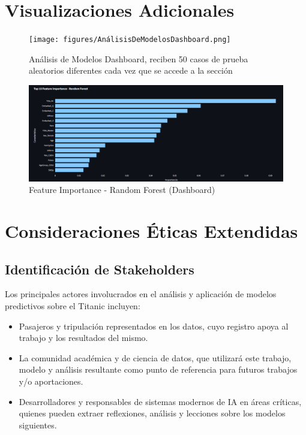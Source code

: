 \documentclass[conference]{IEEEtran}
\begin{document}
\section{Visualizaciones Adicionales}
\begin{figure}[H]
    \centering
    \texttt{[image: figures/AnálisisDeModelosDashboard.png]}
    \caption{Análisis de Modelos Dashboard, reciben 50 casos de prueba aleatorios diferentes cada vez que se accede a la sección}
    \label{fig:placeholder}
\end{figure}

\begin{figure}[H]
    \centering
    \includegraphics[width=\linewidth]{figures/FeatureImportanceRandomForestDashboard.png}
    \caption{Feature Importance - Random Forest (Dashboard)}
    \label{fig:placeholder}
\end{figure}

\section{Consideraciones Éticas Extendidas}
\subsection*{Identificación de Stakeholders}
Los principales actores involucrados en el análisis y aplicación de modelos predictivos sobre el Titanic incluyen:
\begin{itemize}
    \item Pasajeros y tripulación representados en los datos, cuyo registro apoya al trabajo y los resultados del mismo.
    \item La comunidad académica y de ciencia de datos, que utilizará este trabajo, modelo y análisis resultante como punto de referencia para futuros trabajos y/o aportaciones.
    \item Desarrolladores y responsables de sistemas modernos de IA en áreas críticas, quienes pueden extraer reflexiones, análisis y lecciones sobre los modelos siguientes.
\end{itemize}
\end{document}

